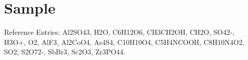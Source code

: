 \documentclass{article}
\begin{document}
\section{Sample}

Reference Entries: \gls{Al2SO43}, \gls{H2O}, \gls{C6H12O6},
\gls{CH3CH2OH}, \gls{CH2O}, \gls{SO42-}, \gls{H3O+},
\gls{O2}, \gls{AlF3}, \gls{Al2CoO4}, \gls{As4S4}, 
\gls{C10H10O4}, \gls{C5H4NCOOH}, \gls{C8H10N4O2},
\gls{SO2}, \gls{S2O72-}, \gls{SbBr3}, \gls{Sc2O3},
\gls{Zr3PO44}.

\printunsrtglossary
\end{document}
